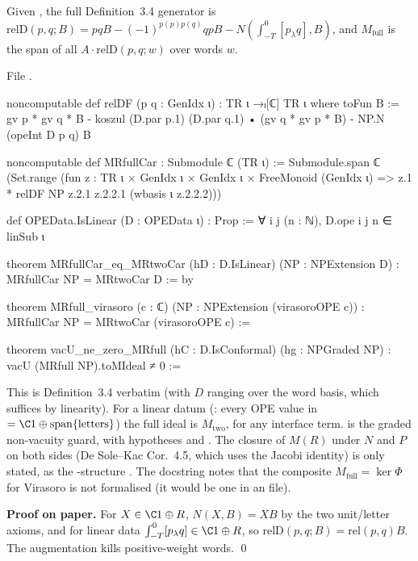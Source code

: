 \begin{definition}\label{l11:def:MRfull}
Given , the full Definition~3.4 generator is $\mathrm{relD}(p,q;B) = pqB - (-1)^{p(p)p(q)}qpB - N(\int_{-T}^0[p_\lambda q],B)$,
and $M_{\mathrm{full}}$ is the span of all $A\cdot\mathrm{relD}(p,q;w)$ over words $w$.
\end{definition}
\noindent File .
\begin{leancode}
noncomputable def relDF (p q : GenIdx ι) : TR ι →ₗ[ℂ] TR ι where
  toFun B := gv p * gv q * B - koszul (D.par p.1) (D.par q.1) • (gv q * gv p * B)
    - NP.N (opeInt D p q) B

noncomputable def MRfullCar : Submodule ℂ (TR ι) :=
  Submodule.span ℂ (Set.range
    (fun z : TR ι × GenIdx ι × GenIdx ι × FreeMonoid (GenIdx ι) =>
      z.1 * relDF NP z.2.1 z.2.2.1 (wbasis ι z.2.2.2)))

def OPEData.IsLinear (D : OPEData ι) : Prop := ∀ i j (n : ℕ), D.ope i j n ∈ linSub ι

theorem MRfullCar_eq_MRtwoCar (hD : D.IsLinear) (NP : NPExtension D) :
    MRfullCar NP = MRtwoCar D := by

theorem MRfull_virasoro (c : ℂ) (NP : NPExtension (virasoroOPE c)) :
    MRfullCar NP = MRtwoCar (virasoroOPE c) :=

theorem vacU_ne_zero_MRfull (hC : D.IsConformal) (hg : NPGraded NP) :
    vacU (MRfull NP).toMIdeal ≠ 0 :=
\end{leancode}

\begin{dictionary}
This is Definition~3.4 verbatim (with $D$ ranging over the word basis, which suffices by linearity). For a linear datum
(: every OPE value in  $=\C1\oplus\operatorname{span}\{\text{letters}\}$) the full ideal is
$M_{\mathrm{two}}$, for any interface term.  is the graded non-vacuity guard, with hypotheses
 and . The closure of $M(R)$ under $N$ and $P$ on both sides (De Sole--Kac Cor.~4.5, which
uses the Jacobi identity) is only stated, as the -structure . The docstring notes that the composite
$M_{\mathrm{full}} = \ker\Phi$ for Virasoro is not formalised (it would be one  in an  file).
\end{dictionary}

\textbf{Proof on paper.} For $X\in\C1\oplus R$, $N(X,B) = XB$ by the two unit/letter axioms, and for linear data
$\int_{-T}^0[p_\lambda q]\in\C1\oplus R$, so $\mathrm{relD}(p,q;B) = \mathrm{rel}(p,q)B$. The augmentation kills positive-weight words. \qed

